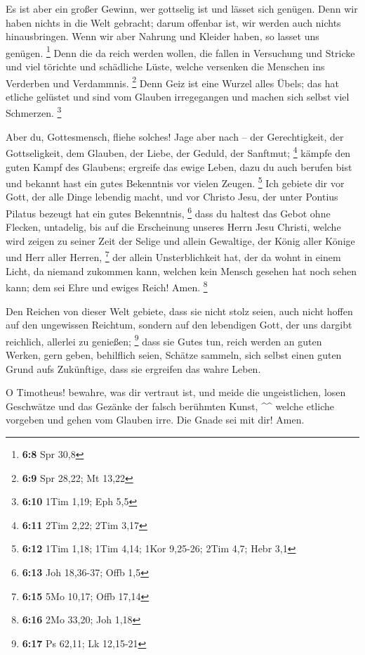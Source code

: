  Es ist aber ein großer Gewinn, wer gottselig ist und
lässet sich genügen.  Denn wir haben nichts in die Welt
gebracht; darum offenbar ist, wir werden auch nichts hinausbringen.
 Wenn wir aber Nahrung und Kleider haben, so lasset uns
genügen. \footnote{\textbf{6:8} Spr 30,8}  Denn die da
reich werden wollen, die fallen in Versuchung und Stricke und viel
törichte und schädliche Lüste, welche versenken die Menschen ins
Verderben und Verdammnis. \footnote{\textbf{6:9} Spr 28,22; Mt 13,22}
 Denn Geiz ist eine Wurzel alles Übels; das hat etliche
gelüstet und sind vom Glauben irregegangen und machen sich selbst viel
Schmerzen. \footnote{\textbf{6:10} 1Tim 1,19; Eph 5,5}

 Aber du, Gottesmensch, fliehe solches! Jage aber nach --
der Gerechtigkeit, der Gottseligkeit, dem Glauben, der Liebe, der
Geduld, der Sanftmut; \footnote{\textbf{6:11} 2Tim 2,22; 2Tim 3,17}
 kämpfe den guten Kampf des Glaubens; ergreife das ewige
Leben, dazu du auch berufen bist und bekannt hast ein gutes Bekenntnis
vor vielen Zeugen. \footnote{\textbf{6:12} 1Tim 1,18; 1Tim 4,14; 1Kor
  9,25-26; 2Tim 4,7; Hebr 3,1}  Ich gebiete dir vor Gott,
der alle Dinge lebendig macht, und vor Christo Jesu, der unter Pontius
Pilatus bezeugt hat ein gutes Bekenntnis, \footnote{\textbf{6:13} Joh
  18,36-37; Offb 1,5}  dass du haltest das Gebot ohne
Flecken, untadelig, bis auf die Erscheinung unseres Herrn Jesu Christi,
 welche wird zeigen zu seiner Zeit der Selige und allein
Gewaltige, der König aller Könige und Herr aller Herren, \footnote{\textbf{6:15}
  5Mo 10,17; Offb 17,14}  der allein Unsterblichkeit hat,
der da wohnt in einem Licht, da niemand zukommen kann, welchen kein
Mensch gesehen hat noch sehen kann; dem sei Ehre und ewiges Reich! Amen.
\footnote{\textbf{6:16} 2Mo 33,20; Joh 1,18}

 Den Reichen von dieser Welt gebiete, dass sie nicht
stolz seien, auch nicht hoffen auf den ungewissen Reichtum, sondern auf
den lebendigen Gott, der uns dargibt reichlich, allerlei zu genießen;
\footnote{\textbf{6:17} Ps 62,11; Lk 12,15-21}  dass sie
Gutes tun, reich werden an guten Werken, gern geben, behilflich seien,
 Schätze sammeln, sich selbst einen guten Grund aufs
Zukünftige, dass sie ergreifen das wahre Leben.

 O Timotheus! bewahre, was dir vertraut ist, und meide
die ungeistlichen, losen Geschwätze und das Gezänke der falsch berühmten
Kunst, \^{}\^{}  welche etliche vorgeben und gehen vom
Glauben irre. Die Gnade sei mit dir! Amen.
